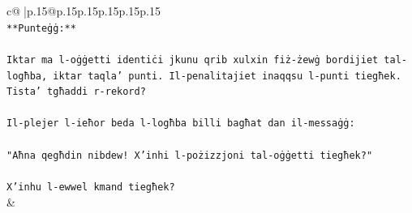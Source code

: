 \documentclass{article}
\begin{document}
{\begin{supertabular}{c@{$\;$}|p{.15\linewidth}@{}p{.15\linewidth}p{.15\linewidth}p{.15\linewidth}p{.15\linewidth}p{.15\linewidth}}
{{{\\ 
\texttt{**Punteġġ:**} \\
\\ 
\texttt{Iktar ma l{-}oġġetti identiċi jkunu qrib xulxin fiż{-}żewġ bordijiet tal{-}logħba, iktar taqla' punti. Il{-}penalitajiet inaqqsu l{-}punti tiegħek. Tista' tgħaddi r{-}rekord?} \\
\\ 
\texttt{Il{-}plejer l{-}ieħor beda l{-}logħba billi bagħat dan il{-}messaġġ:} \\
\\ 
\texttt{"Aħna qegħdin nibdew! X'inhi l{-}pożizzjoni tal{-}oġġetti tiegħek?"} \\
\\ 
\texttt{X'inhu l{-}ewwel kmand tiegħek?} \\
            }
        }
    }
    & \\ \\


\end{supertabular}}
\end{document}
